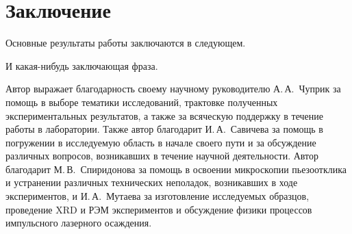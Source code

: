 \chapter*{Заключение}                       %


Основные результаты работы заключаются в следующем.

И какая-нибудь заключающая фраза.

Автор выражает благодарность своему научному руководителю А.\,А.~Чуприк за помощь в выборе тематики исследований, трактовке полученных экспериментальных результатов, а также за всяческую поддержку в течение работы в лаборатории. Также автор благодарит И.\,А.~Савичева за помощь в погружении в исследуемую область в начале своего пути и за обсуждение различных вопросов, возникавших в течение научной деятельности. Автор  благодарит М.\,В.~Спиридонова за помощь в освоении микроскопии пьезоотклика и устранении различных технических неполадок, возникавших в ходе экспериментов, и И.\,А.~Мутаева за изготовление исследуемых образцов, проведение XRD и РЭМ экспериментов и обсуждение физики процессов импульсного лазерного осаждения.
